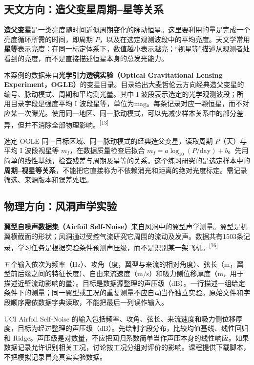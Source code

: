 \subsection*{天文方向：造父变星周期--星等关系}

\label{sec:ogle-intro}
\textbf{造父变星}是一类亮度随时间近似周期变化的脉动恒星。这里要利用的量是完成一个亮度循环所需的时间，即周期 $P$，以及在选定观测波段中的平均亮度。天文学常用\textbf{星等}表示亮度：在同一标定体系下，数值越小表示越亮；“视星等”描述从观测者处看到的亮度，而不是直接描述恒星本身的总发光能力。

本案例的数据来自\textbf{光学引力透镜实验（Optical Gravitational Lensing Experiment，OGLE）}的变星目录。目录给出大麦哲伦云方向经典造父变星的编号、脉动模式、周期和平均测光量。其中 I 波段表示选定的光学观测波段；所用目录字段是强度平均 I 波段星等，单位为mag。每条记录对应一颗恒星，而不对应某一次曝光。使用同一地区、同一脉动模式，可以先减少样本关系中的部分差异，但并不消除全部物理影响。\textsuperscript{[13]}

选定 OGLE 同一目标区域、同一脉动模式的经典造父变星，读取周期 $P$（天）与平均 I 波段视星等 $m_I$，在数据质量检查后拟合 $m_I=a\log_{10}(P/\mathrm{day})+b$。先用简单的线性基线，检查残差与周期及星等的关系。这个练习研究的是选定样本中的\textbf{周期--视星等关系}，不能把它直接称为不依赖消光和距离的绝对光度标定。需记录筛选、来源版本和误差处理。

\subsection*{物理方向：风洞声学实验}

\label{sec:airfoil-intro}
\textbf{翼型自噪声数据集（Airfoil Self-Noise）}来自风洞中的翼型声学测量。翼型是机翼横截面的形状；风洞通过受控气流研究它周围的流动及发声。数据共有1503条记录，学习任务是根据实验条件预测声压级，而不是识别某一架飞机。\textsuperscript{[16]}

五个输入依次为频率（Hz）、攻角（度，翼型与来流的相对角度）、弦长（m，翼型前后缘之间的特征长度）、自由来流速度（m/s）和吸力侧位移厚度（m，用于描述近壁流动影响的量）。目标是数据源整理的声压级（dB）。一行描述一组给定条件下的测量；同一翼型或工况的重复测量不应自动当作独立实验。原始文件和字段顺序需依数据字典读取，不能把最后一列误作输入。

UCI Airfoil Self-Noise 的输入包括频率、攻角、弦长、来流速度和吸力侧位移厚度，目标为经过整理的声压级（dB）。先绘制字段分布，比较均值基线、线性回归和 Ridge。声压级是对数量，不应把回归系数简单当作声压本身的线性响应。如果数据记录允许识别相关工况，讨论按工况分组对评价的影响。课程提供下载脚本，不把模拟记录冒充真实实验数据。

